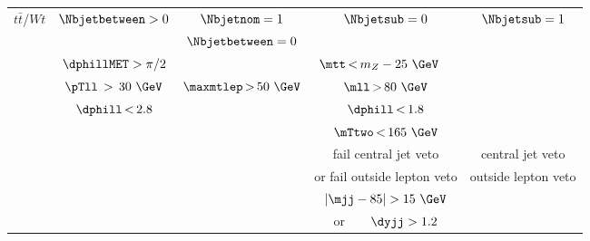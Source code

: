 \begin{tabular}{c|| c | c | c | c}
    \hline\hline
    \multirow{10}{*}{$t\bar{t}$/$Wt$}   & \multirow{2}{*}{$\Nbjetbetween>0$}                   & $\Nbjetnom = 1$                                               & \multirow{2}{*}{$\Nbjetsub=0$} & \multirow{2}{*}{$\Nbjetsub=1$} \\
                                        &                                                      & $\Nbjetbetween  = 0$                                          &                                &                                \\ \cline{3-5}
                                        & $\dphillMET > \pi/2$                                 & \multicolumn{3}{c}{\phantom{ccccc}$\mtt\,{<}\,m_Z - 25~\GeV$}                                                                   \\ \cline{3-5}
                                        & $\pTll\, > \, 30~\GeV$                               & $\maxmtlep\,{>}\,50~\GeV$                                     & $\mll\,{>}\,80~\GeV$           &                                \\
                                        & $\dphill\,{<}\,2.8$                                  &                                                               & $\dphill\,{<}\,1.8$            &                                \\
                                        &                                                      &                                                               & $\mTtwo\,{<}\,165~\GeV$        &                                \\ \cline{4-4}
                                        &                                                      &                                                               & fail central jet veto          & central jet veto               \\
                                        &                                                      &                                                               & or fail outside lepton veto    & outside lepton veto            \\ \cline{4-4}
                                        &                                                      &                                                               & $|\mjj-85| > 15~\GeV$          &                                \\
                                        &                                                      &                                                               & or\ \ \ \ $\dyjj > 1.2$        &                                \\

\end{tabular}
